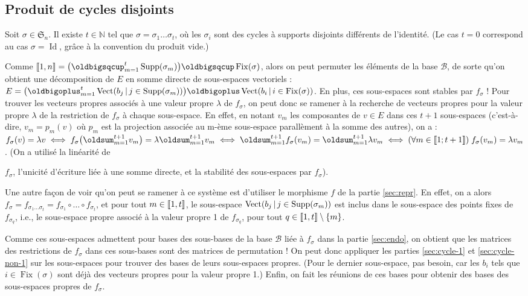 \documentclass[10pt,a4paper,french,landscape]{article}
\DeclarePairedDelimiter\parenlong{\lparen}{\rparen}
\newcommand{\paren}[1]{\parenlong*{#1}}
\DeclarePairedDelimiter\bracketlong{\llbracket}{\rrbracket}
\newcommand{\br}[1]{\bracketlong*{#1}}
\renewcommand{\sum}{\displaystyle\oldsum}
\renewcommand{\bigoplus}{\displaystyle\oldbigoplus}
\renewcommand{\bigsqcup}{\displaystyle\oldbigsqcup}
\theoremstyle{definition}
\theoremstyle{remark}
\DeclareMathOperator{\Fix}{Fix}
\DeclareMathOperator{\Id}{Id}
\DeclareMathOperator{\Vect}{Vect}
\DeclareMathOperator{\Supp}{Supp}
\newcommand{\NN}{\mathbb N}
\newcommand{\Sy}{\mathfrak{S}}
\newcommand{\1}{\mathbbm{1}}
\newcommand{\Sn}[1][n]{\Sy_{#1}}
\newcommand{\ba}[1]{\mathcal{#1}}
\begin{document}
\begin{multicols*}{2}
\section{Produit de cycles disjoints}
\label{sec:pdt}

Soit $\sigma\in\Sn$. Il existe $t\in\NN$ tel que $\sigma=\sigma_1\dots\sigma_t$, où les $\sigma_i$ sont des cycles à supports disjoints différents de l'identité. (Le cas $t=0$ correspond au cas $\sigma=\Id$, grâce à la convention du produit vide.)

Comme $\br{1,n}=\paren{\bigsqcup_{m=1}^t\Supp(\sigma_m)}\bigsqcup\Fix(\sigma)$, alors on peut permuter les éléments de la base $\ba{B}$, de sorte qu'on obtient une décomposition de $E$ en somme directe de sous-espaces vectoriels :
$E=\paren{\bigoplus_{m=1}^t\Vect\paren{b_j\,|\,j\in\Supp(\sigma_m)}}\bigoplus\Vect\paren{b_i\,|\,i\in\Fix(\sigma)}$. En plus, ces sous-espaces sont stables par $f_\sigma$ ! Pour trouver les vecteurs propres associés à une valeur propre $\lambda$ de $f_\sigma$, on peut donc se ramener à la recherche de vecteurs propres pour la valeur propre $\lambda$ de la restriction de $f_\sigma$ à chaque sous-espace. En effet, en notant $v_m$ les composantes de $v\in E$ dans ces $t+1$ sous-espaces (c'est-à-dire, $v_m=p_m(v)$ où $p_m$ est la projection associée au m-ème sous-espace parallèment à la somme des autres), on a :
${f_\sigma(v)=\lambda v}
\iff {f_\sigma\paren{\sum_{m=1}^{t+1}v_m}=\lambda \sum_{m=1}^{t+1}v_m}
\iff {\sum_{m=1}^{t+1}f_\sigma\paren{v_m}=\sum_{m=1}^{t+1}\lambda v_m}
\iff {(\forall m\in\br{1;t+1})\;f_\sigma\paren{v_m}=\lambda v_m}$. (On a utilisé la linéarité de\smallskip

\noindent
$f_\sigma$, l'unicité d'écriture liée à une somme directe, et la stabilité des sous-espaces par $f_\sigma$).\medskip

Une autre façon de voir qu'on peut se ramener à ce système est d'utiliser le morphisme $f$ de la partie \ref{sec:repr}. En effet, on a alors $f_\sigma=f_{\sigma_1\dots\sigma_t}=f_{\sigma_1}\circ\dots\circ f_{\sigma_t}$, et pour tout $m\in\br{1,t}$, le sous-espace $\Vect\paren{b_j\,|\,j\in\Supp(\sigma_m)}$ est inclus dans le sous-espace des points fixes de $f_{\sigma_q}$, i.e., le sous-espace propre associé à la valeur propre 1 de $f_{\sigma_q}$, pour tout $q\in\br{1,t}\setminus\{m\}$.\medskip

Comme ces sous-espaces admettent pour bases des sous-bases de la base $\ba{B}$ liée à $f_\sigma$ dans la partie \ref{sec:endo}, on obtient que les matrices des restrictions de $f_\sigma$ dans ces sous-bases sont des matrices de permutation ! On peut donc appliquer les parties \ref{sec:cycle-1} et \ref{sec:cycle-non-1} sur les sous-espaces pour trouver des bases de leurs sous-espaces propres. (Pour le dernier sous-espace, pas besoin, car les $b_i$ tels que $i\in\Fix(\sigma)$ sont déjà des vecteurs propres pour la valeur propre 1.)
Enfin, on fait les réunions de ces bases pour obtenir des bases des sous-espaces propres de $f_\sigma$.


\end{multicols*}
\end{document}
